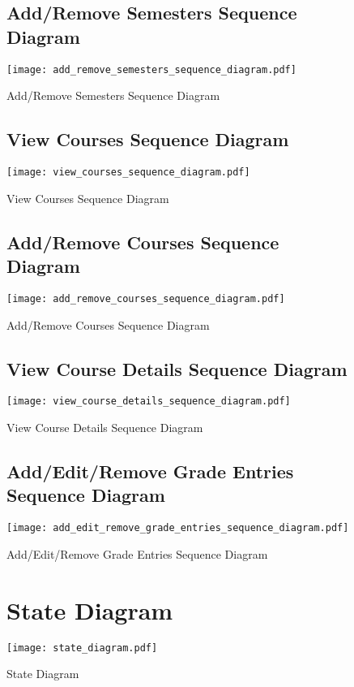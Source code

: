 \documentclass[12pt]{article}
\begin{document}
\begin{figure}[p!]
  \subsection{Add/Remove Semesters Sequence Diagram}
  \centering
  \texttt{[image: add\_remove\_semesters\_sequence\_diagram.pdf]}
  \caption{Add/Remove Semesters Sequence Diagram}
\end{figure}

\begin{figure}[p!]
  \subsection{View Courses Sequence Diagram}
  \centering
  \texttt{[image: view\_courses\_sequence\_diagram.pdf]}
  \caption{View Courses Sequence Diagram}
\end{figure}

\begin{figure}[p!]
  \subsection{Add/Remove Courses Sequence Diagram}
  \centering
  \texttt{[image: add\_remove\_courses\_sequence\_diagram.pdf]}
  \caption{Add/Remove Courses Sequence Diagram}
\end{figure}

\begin{figure}[p!]
  \subsection{View Course Details Sequence Diagram}
  \centering
  \texttt{[image: view\_course\_details\_sequence\_diagram.pdf]}
  \caption{View Course Details Sequence Diagram}
\end{figure}

\begin{figure}[p!]
  \subsection{Add/Edit/Remove Grade Entries Sequence Diagram}
  \centering
  \texttt{[image: add\_edit\_remove\_grade\_entries\_sequence\_diagram.pdf]}
  \caption{Add/Edit/Remove Grade Entries Sequence Diagram}
\end{figure}

\begin{figure}[p!]
  \section{State Diagram}
  \centering
  \texttt{[image: state\_diagram.pdf]}
  \caption{State Diagram}
\end{figure}
\end{document}
